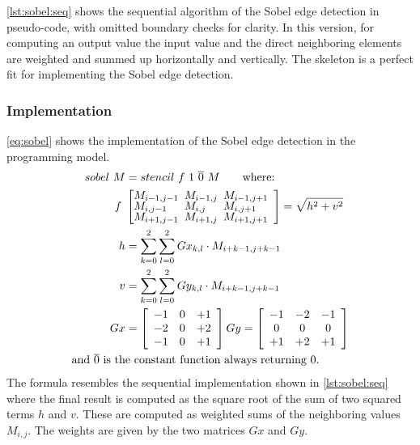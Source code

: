 \autoref{lst:sobel:seq} shows the sequential algorithm of the Sobel edge detection in pseudo-code, with omitted boundary checks for clarity.
In this version, for computing an output value  the input value  and the direct neighboring elements are weighted and summed up horizontally and vertically.
The \stencil skeleton is a perfect fit for implementing the Sobel edge detection.

\subsubsection*{\SkelCL Implementation}
\autoref{eq:sobel} shows the implementation of the Sobel edge detection in the \SkelCL programming model.
\begin{align}
  \label{eq:sobel}
  sobel\ M& = stencil\ f\ 1\ \overline{0}\ M \qquad\text{where:}\\
  f\ &\left[\begin{array}{lll}%
      \hspace{-.5em} M_{i-1,j-1}& \hspace{-.5em} M_{i-1,j} & \hspace{-.5em}M_{i-1,j+1}\vspace{-.25em}\\%
      \hspace{-.5em} M_{i,j-1}& \hspace{-.5em} M_{i,j} & \hspace{-.5em}M_{i,j+1}\vspace{-.25em}\\%
      \hspace{-.5em} M_{i+1,j-1}& \hspace{-.5em} M_{i+1,j} & \hspace{-.5em}M_{i+1,j+1}
    \end{array}\right] = \displaystyle\sqrt{ h^2 + v^2 }\nonumber\\
  h & = \sum_{k=0}^2 \sum_{l=0}^2 Gx_{k, l}\cdot M_{i+k-1,j+k-1}\nonumber\\
  v & = \sum_{k=0}^2 \sum_{l=0}^2 Gy_{k, l}\cdot M_{i+k-1,j+k-1}\nonumber\\
  Gx& = \left[\begin{array}{ccc}%
      -1&0&+1\\
      -2&0&+2\\
      -1&0&+1
    \end{array}\right]
  Gy = \left[\begin{array}{ccc}%
      -1&-2&-1\\
      0&0&0\\
      +1&+2&+1
    \end{array}\right] \nonumber\\
  \text{and } \overline{0} \text{ is th}&\text{e constant function always returning 0.}\nonumber
\end{align}
The formula resembles the sequential implementation shown in \autoref{lst:sobel:seq} where the final result is computed as the square root of the sum of two squared terms $h$ and $v$.
These are computed as weighted sums of the neighboring values $M_{i,j}$.
The weights are given by the two matrices $Gx$ and $Gy$.

